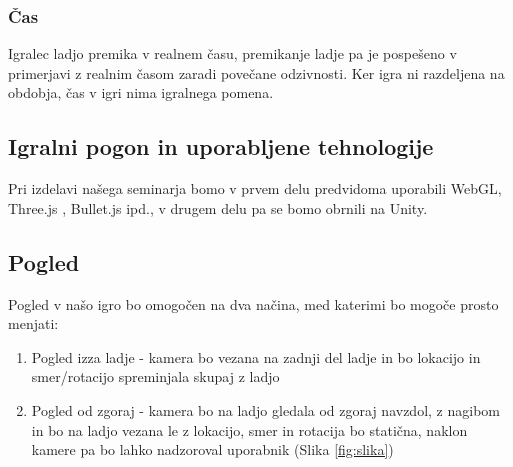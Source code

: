 \documentclass[a4paper]{article}
\begin{document}
\subsubsection{Čas}
Igralec ladjo premika v realnem času, premikanje ladje pa je pospešeno v primerjavi z realnim časom zaradi povečane odzivnosti. Ker igra ni razdeljena na obdobja, čas v igri nima igralnega pomena.

\subsection{Igralni pogon in uporabljene tehnologije}
Pri izdelavi našega seminarja bomo v prvem delu predvidoma uporabili WebGL, Three.js \cite{dirksen2013learning}, Bullet.js ipd., v drugem delu pa se bomo obrnili na Unity.

\subsection{Pogled}
Pogled v našo igro bo omogočen na dva načina, med katerimi bo mogoče prosto menjati:
\begin{enumerate}
\item Pogled izza ladje - kamera bo vezana na zadnji del ladje in bo lokacijo in smer/rotacijo spreminjala skupaj z ladjo
\item Pogled od zgoraj - kamera bo na ladjo gledala od zgoraj navzdol, z nagibom in bo na ladjo vezana le z lokacijo, smer in rotacija bo statična, naklon kamere pa bo lahko nadzoroval uporabnik (Slika \ref{fig:slika})
\end{enumerate}


\small


\end{document}
